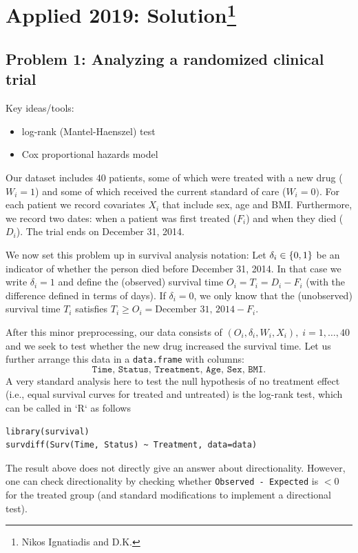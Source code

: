 \section{Applied 2019: Solution\footnote{Nikos Ignatiadis and D.K.}}



\subsection*{Problem 1: Analyzing a randomized clinical trial}

Key ideas/tools:
\begin{itemize}
  \item log-rank (Mantel-Haenszel) test
  \item Cox proportional hazards model
\end{itemize}

Our dataset includes 40 patients, some of which were treated with a new drug ($W_i=1$) and some of which received the current standard of care ($W_i=0)$. For each patient we record covariates $X_i$ that include sex, age and BMI. Furthermore, we record two dates: when a patient was first treated ($F_i$) and when they died ($D_i$). The trial ends on December 31, 2014. 

We now set this problem up in survival analysis notation: Let $\delta_i \in \left\{0,1\right\}$ be an indicator of whether the person died before December 31, 2014. In that case we write $\delta_i=1$ and define the (observed) survival time $O_i=T_i = D_i - F_i$ (with the difference defined in terms of days). If $\delta_i =0$, we only know that the (unobserved) survival time $T_i$ satisfies  $T_i\geq O_i = \text{December 31, 2014} - F_i$.        

After this minor preprocessing, our data consists of $(O_i, \delta_i, W_i, X_i), \; i=1,\dotsc,40$ and we seek to test whether the new drug increased the survival time. Let us further arrange this data in a \texttt{data.frame} with columns: 
$$\texttt{Time, Status, Treatment, Age, Sex, BMI}.$$ 
A very standard analysis here to test the null hypothesis of no treatment effect (i.e., equal survival curves for treated and untreated) is the log-rank test, which can be called in `R` as follows
\begin{verbatim}
library(survival)
survdiff(Surv(Time, Status) ~ Treatment, data=data)
\end{verbatim}
The result above does not directly give an answer about directionality. However, one can check directionality by checking whether \texttt{Observed - Expected} is $<0$ for the treated group (and standard modifications to implement a directional test).

